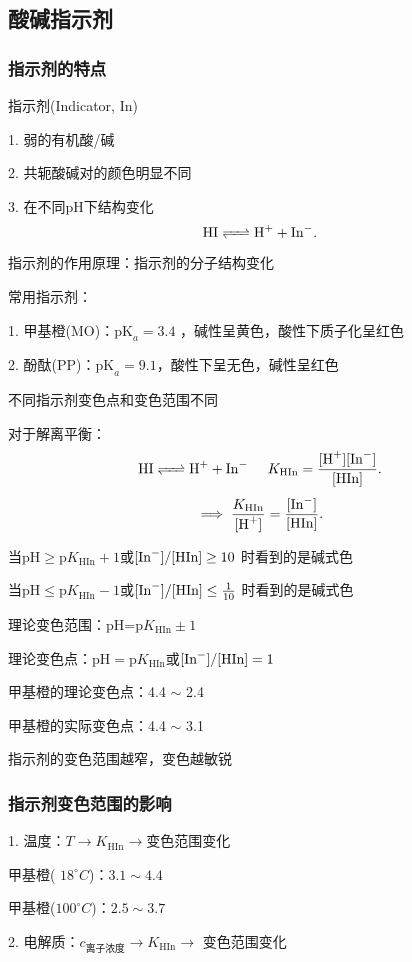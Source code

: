 \subsection{酸碱指示剂}%
\label{sub:酸碱指示剂}
\subsubsection{指示剂的特点}%
\label{subsub:指示剂的特点}
指示剂(Indicator, In)

1. 弱的有机酸/碱

2. 共轭酸碱对的颜色明显不同

3. 在不同pH下结构变化
\[
    \ce{HI <=> H+ +In-}
.\] 
\begin{notation}
    指示剂的作用原理：指示剂的分子结构变化
\end{notation}
\begin{eg}
    常用指示剂：

    1. 甲基橙(MO)：$\text{pK}_a=3.4$ ，碱性呈黄色，酸性下质子化呈红色

    2. 酚酞(PP)：$\text{pK}_a=9.1$，酸性下呈无色，碱性呈红色
\end{eg}
\begin{notation}
    不同指示剂变色点和变色范围不同
\end{notation}
对于解离平衡：
\[
    \ce{HI <=> H+ +In-} \hspace{0.5cm} K_{\text{HIn}}=\frac{[\ce{H+}][\ce{In-}]}{[\text{HIn}]}
.\] 
\[
    \implies \frac{K_{\text{HIn}}}{[\ce{H+}]}=\frac{[\ce{In-}]}{[\text{HIn}]}
.\] 

当$\text{pH}\ge \text{p}K_{\text{HIn}}+1$或$[\ce{In-}] / [\text{HIn}]\ge 10$ 时看到的是碱式色

当$\text{pH}\le  \text{p}K_{\text{HIn}}-1$或$[\ce{In-}] / [\text{HIn}]\le  \frac{1}{10}$ 时看到的是碱式色

\begin{notation}
    理论变色范围：pH=$\text{p}K_{\text{HIn}}\pm 1$

    理论变色点：$\text{pH}= \text{p}K_{\text{HIn}}$或$[\ce{In-}] / [\text{HIn}]=1$

    甲基橙的理论变色点：4.4 $\sim $ 2.4

    甲基橙的实际变色点：4.4 $\sim $ 3.1
\end{notation}
\begin{notation}
    指示剂的变色范围越窄，变色越敏锐
\end{notation}
\subsubsection{指示剂变色范围的影响}%
\label{subsub:指示剂变色范围的影响}
1. 温度：$T\to K_{\text{HIn}}\to $变色范围变化
\begin{eg}
    甲基橙( $18^\circ C$)：$3.1\sim 4.4$ 

    甲基橙($100^\circ C$)：$2.5\sim 3.7$
\end{eg}
2. 电解质：$c_\text{离子浓度}\to K_{\text{HIn}}\to$ 变色范围变化


